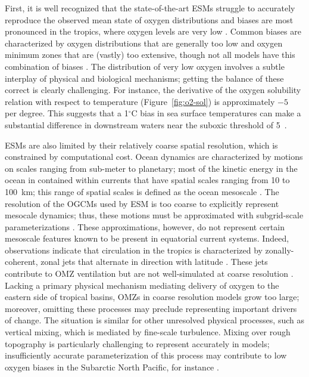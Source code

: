 \documentclass{report_chapter}
\begin{document}
First, it is well recognized that the state-of-the-art ESMs struggle to accurately reproduce the observed mean state of oxygen distributions and biases are most pronounced in the tropics, where oxygen levels are very low \citep{Bopp-Resplandy-etal-2013}.
Common biases are characterized by oxygen distributions that are generally too low and oxygen minimum zones that are (vastly) too extensive, though not all models have this combination of biases \citep{Bopp-Resplandy-etal-2013}.
The distribution of very low oxygen involves a subtle interplay of physical and biological mechanisms; getting the balance of these correct is clearly challenging.
For instance, the derivative of the oxygen solubility relation with respect to temperature (Figure~\ref{fig:o2-sol}) is approximately $-5$~\mmolmmm{} per degree.
This suggests that a 1$^\circ$C bias in sea surface temperatures can make a substantial difference in downstream waters near the suboxic threshold of 5~\mmolmmm{}.

ESMs are also limited by their relatively coarse spatial resolution, which is constrained by computational cost.
Ocean dynamics are characterized by motions on scales ranging from sub-meter to planetary; most of the kinetic energy in the ocean in contained within currents that have spatial scales ranging from 10 to 100~km; this range of spatial scales is defined as the ocean mesoscale \citep{Stammer-1997}.
The resolution of the OGCMs used by ESM is too coarse to explicitly represent mesocale dynamics; thus, these motions must be approximated with subgrid-scale parameterizations \citep[e.g.,][]{Gent-McWilliams-1990}.
These approximations, however, do not represent certain mesoscale features known to be present in equatorial current systems.
Indeed, observations indicate that circulation in the tropics is characterized by zonally-coherent, zonal jets that alternate in direction with latitude \citep{Cravatte-Kessler-etal-2012}.
These jets contribute to OMZ ventilation but are not well-simulated at coarse resolution \citep{Brandt-Hormann-etal-2008,Brandt-Greatbatch-etal-2012,Dietze-Loeptien-2013,Getzlaff-Dietze-2013,Duteil-Schwarzkopf-etal-2014}.
Lacking a primary physical mechanism mediating delivery of oxygen to the eastern side of tropical basins, OMZs in coarse resolution models grow too large; moreover, omitting these processes may preclude representing important drivers of change.
The situation is similar for other unresolved physical processes, such as vertical mixing, which is mediated by fine-scale turbulence.
Mixing over rough topography is particularly challenging to represent accurately in models; insufficiently accurate parameterization of this process may contribute to low oxygen biases in the Subarctic North Pacific, for instance \citep{Nakamura-Toyoda-etal-2006}.
\end{document}
